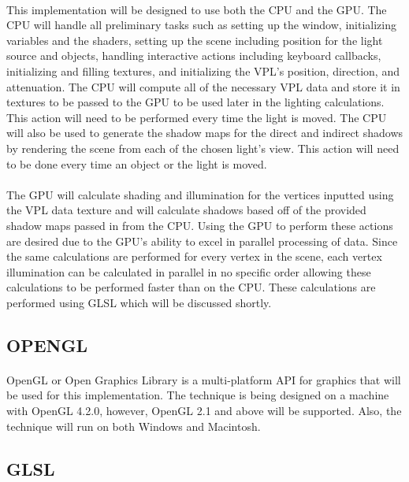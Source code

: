 \paragraph{}
This implementation will be designed to use both the CPU and the GPU.  The CPU will handle all preliminary tasks such as setting up the window, initializing variables and the shaders, setting up the scene including position for the light source and objects, handling interactive actions including keyboard callbacks, initializing and filling textures, and initializing the VPL's position, direction, and attenuation.  The CPU will compute all of the necessary VPL data and store it in textures to be passed to the GPU to be used later in the lighting calculations.  This action will need to be performed every time the light is moved.  The CPU will also be used to generate the shadow maps for the direct and indirect shadows by rendering the scene from each of the chosen light's view.  This action will need to be done every time an object or the light is moved.

\paragraph{}
The GPU will calculate shading and illumination for the vertices inputted using the VPL data texture and will calculate shadows based off of the provided shadow maps passed in from the CPU.  Using the GPU to perform these actions are desired due to the GPU's ability to excel in parallel processing of data.  Since the same calculations are performed for every vertex in the scene, each vertex illumination can be calculated in parallel in no specific order allowing these calculations to be performed faster than on the CPU.  These calculations are performed using GLSL which will be discussed shortly.

\subsection{OPENGL}
\paragraph{}
OpenGL or Open Graphics Library is a multi-platform API for graphics that will be used for this implementation.  The technique is being designed on a machine with OpenGL 4.2.0, however, OpenGL 2.1 and above will be supported.  Also, the technique will run on both Windows and Macintosh.

\subsection{GLSL}
